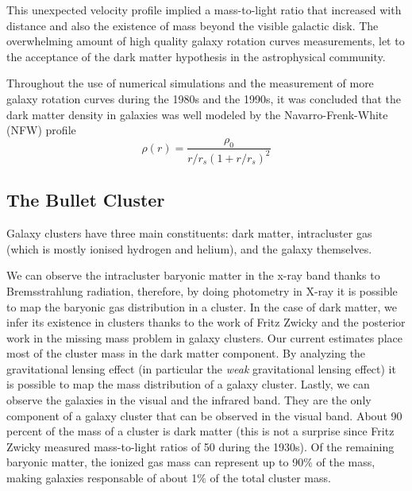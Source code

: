 This unexpected velocity profile implied a mass-to-light ratio that increased with distance and also the existence of mass beyond the visible galactic disk\cite{theIsMassOutside}.
The overwhelming amount of high quality galaxy rotation curves measurements, let to the acceptance of the dark matter hypothesis in the astrophysical community.

Throughout the use of numerical simulations and the measurement of more galaxy rotation curves during the 1980s and the 1990s, it was concluded that the dark matter density in galaxies was well modeled by the Navarro-Frenk-White (NFW) profile\cite{FWN}\cite{mariangela}
\begin{equation}
\rho(r) = \frac{\rho_0}{r/r_s(1+r/r_s)^2}
\end{equation}
\subsection{The Bullet Cluster}
Galaxy clusters have three main constituents: dark matter, intracluster gas (which is mostly ionised hydrogen and helium), and the galaxy themselves.\cite{book:75345}

We can observe the intracluster baryonic matter in the x-ray band thanks to Bremsstrahlung radiation, therefore, by doing photometry in X-ray it is possible to map the baryonic gas distribution in a cluster.
In the case of dark matter, we infer its existence in clusters thanks to the work of Fritz Zwicky and the posterior work in the missing mass problem in galaxy clusters.
Our current estimates place most of the cluster mass in the dark matter component.
By analyzing the gravitational lensing effect (in particular the \emph{weak} gravitational lensing effect) it is possible to map the mass distribution of a galaxy cluster. 
Lastly, we can observe the galaxies in the visual and the infrared band.
They are the only component of a galaxy cluster that can be observed in the visual band.
About 90 percent of the mass of a cluster is dark matter (this is not a surprise since Fritz Zwicky measured mass-to-light ratios of 50 during the 1930s). Of the remaining baryonic matter, the ionized gas mass can represent up to 90$\%$ of the mass, making galaxies responsable of about 1$\%$ of the total cluster mass.

